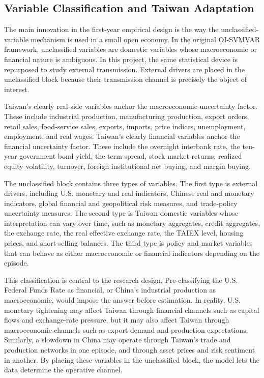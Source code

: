 \documentclass[12pt]{article}
\begin{document}
\subsection{Variable Classification and Taiwan Adaptation}

The main innovation in the first-year empirical design is the way the unclassified-variable
mechanism is used in a small open economy. In the original OI-SVMVAR framework, unclassified
variables are domestic variables whose macroeconomic or financial nature is ambiguous. In this
project, the same statistical device is repurposed to study external transmission. External drivers
are placed in the unclassified block because their transmission channel is precisely the object of
interest.

Taiwan's clearly real-side variables anchor the macroeconomic uncertainty factor. These include
industrial production, manufacturing production, export orders, retail sales, food-service sales,
exports, imports, price indices, unemployment, employment, and real wages. Taiwan's clearly
financial variables anchor the financial uncertainty factor. These include the overnight interbank
rate, the ten-year government bond yield, the term spread, stock-market returns, realized equity
volatility, turnover, foreign institutional net buying, and margin buying.

The unclassified block contains three types of variables. The first type is external drivers, including
U.S. monetary and real indicators, Chinese real and monetary indicators, global financial and
geopolitical risk measures, and trade-policy uncertainty measures. The second type is Taiwan
domestic variables whose interpretation can vary over time, such as monetary aggregates, credit
aggregates, the exchange rate, the real effective exchange rate, the TAIEX level, housing prices,
and short-selling balances. The third type is policy and market variables that can behave as either
macroeconomic or financial indicators depending on the episode.

This classification is central to the research design. Pre-classifying the U.S. Federal Funds Rate
as financial, or China's industrial production as macroeconomic, would impose the answer before
estimation. In reality, U.S. monetary tightening may affect Taiwan through financial channels such
as capital flows and exchange-rate pressure, but it may also affect Taiwan through macroeconomic
channels such as export demand and production expectations. Similarly, a slowdown in China may
operate through Taiwan's trade and production networks in one episode, and through asset prices
and risk sentiment in another. By placing these variables in the unclassified block, the model lets
the data determine the operative channel.
\end{document}
